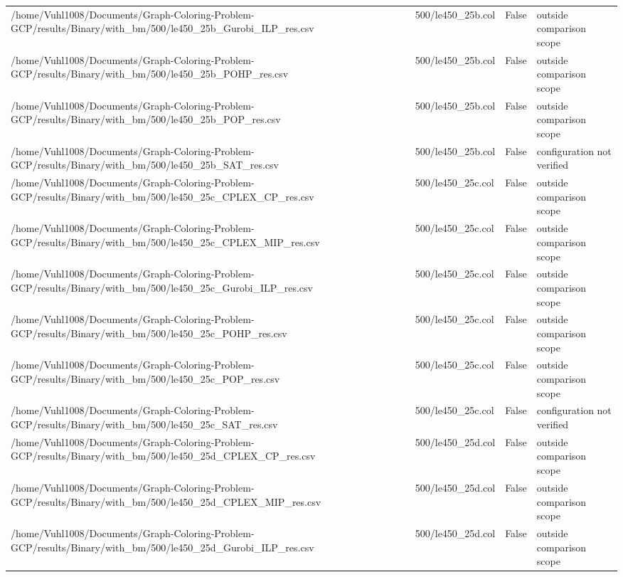 \begin{table}[htbp]
\begin{tabular}{llll}
/home/Vuhl1008/Documents/Graph-Coloring-Problem-GCP/results/Binary/with\_bm/500/le450\_25b\_Gurobi\_ILP\_res.csv & 500/le450\_25b.col & False & outside comparison scope \\
/home/Vuhl1008/Documents/Graph-Coloring-Problem-GCP/results/Binary/with\_bm/500/le450\_25b\_POHP\_res.csv & 500/le450\_25b.col & False & outside comparison scope \\
/home/Vuhl1008/Documents/Graph-Coloring-Problem-GCP/results/Binary/with\_bm/500/le450\_25b\_POP\_res.csv & 500/le450\_25b.col & False & outside comparison scope \\
/home/Vuhl1008/Documents/Graph-Coloring-Problem-GCP/results/Binary/with\_bm/500/le450\_25b\_SAT\_res.csv & 500/le450\_25b.col & False & configuration not verified \\
/home/Vuhl1008/Documents/Graph-Coloring-Problem-GCP/results/Binary/with\_bm/500/le450\_25c\_CPLEX\_CP\_res.csv & 500/le450\_25c.col & False & outside comparison scope \\
/home/Vuhl1008/Documents/Graph-Coloring-Problem-GCP/results/Binary/with\_bm/500/le450\_25c\_CPLEX\_MIP\_res.csv & 500/le450\_25c.col & False & outside comparison scope \\
/home/Vuhl1008/Documents/Graph-Coloring-Problem-GCP/results/Binary/with\_bm/500/le450\_25c\_Gurobi\_ILP\_res.csv & 500/le450\_25c.col & False & outside comparison scope \\
/home/Vuhl1008/Documents/Graph-Coloring-Problem-GCP/results/Binary/with\_bm/500/le450\_25c\_POHP\_res.csv & 500/le450\_25c.col & False & outside comparison scope \\
/home/Vuhl1008/Documents/Graph-Coloring-Problem-GCP/results/Binary/with\_bm/500/le450\_25c\_POP\_res.csv & 500/le450\_25c.col & False & outside comparison scope \\
/home/Vuhl1008/Documents/Graph-Coloring-Problem-GCP/results/Binary/with\_bm/500/le450\_25c\_SAT\_res.csv & 500/le450\_25c.col & False & configuration not verified \\
/home/Vuhl1008/Documents/Graph-Coloring-Problem-GCP/results/Binary/with\_bm/500/le450\_25d\_CPLEX\_CP\_res.csv & 500/le450\_25d.col & False & outside comparison scope \\
/home/Vuhl1008/Documents/Graph-Coloring-Problem-GCP/results/Binary/with\_bm/500/le450\_25d\_CPLEX\_MIP\_res.csv & 500/le450\_25d.col & False & outside comparison scope \\
/home/Vuhl1008/Documents/Graph-Coloring-Problem-GCP/results/Binary/with\_bm/500/le450\_25d\_Gurobi\_ILP\_res.csv & 500/le450\_25d.col & False & outside comparison scope \\

\end{tabular}
\end{table}
